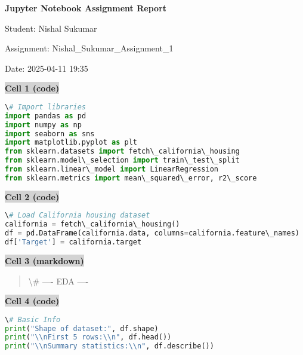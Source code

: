 \documentclass{article}
\begin{document}
\begin{center}
\Large\textbf{Jupyter Notebook Assignment Report}

\vspace{0.5cm}
\normalsize
Student: Nishal Sukumar

Assignment: Nishal_Sukumar_Assignment_1

Date: 2025-04-11 19:35
\end{center}

\vspace{1cm}


\vspace{0.5cm}
\noindent\colorbox{lightgray}{\textbf{Cell 1 (code)}}
\vspace{0.3cm}


\begin{lstlisting}[language=Python]
\# Import libraries
import pandas as pd
import numpy as np
import seaborn as sns
import matplotlib.pyplot as plt
from sklearn.datasets import fetch\_california\_housing
from sklearn.model\_selection import train\_test\_split
from sklearn.linear\_model import LinearRegression
from sklearn.metrics import mean\_squared\_error, r2\_score
\end{lstlisting}


\vspace{0.5cm}
\noindent\colorbox{lightgray}{\textbf{Cell 2 (code)}}
\vspace{0.3cm}


\begin{lstlisting}[language=Python]
\# Load California housing dataset
california = fetch\_california\_housing()
df = pd.DataFrame(california.data, columns=california.feature\_names)
df['Target'] = california.target
\end{lstlisting}


\vspace{0.5cm}
\noindent\colorbox{lightgray}{\textbf{Cell 3 (markdown)}}
\vspace{0.3cm}


\begin{quote}
\textbackslash{}# ---- EDA ----
\end{quote}


\vspace{0.5cm}
\noindent\colorbox{lightgray}{\textbf{Cell 4 (code)}}
\vspace{0.3cm}


\begin{lstlisting}[language=Python]
\# Basic Info
print("Shape of dataset:", df.shape)
print("\\nFirst 5 rows:\\n", df.head())
print("\\nSummary statistics:\\n", df.describe())
\end{lstlisting}
\end{document}

